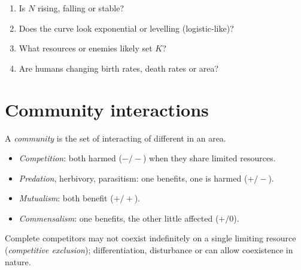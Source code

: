 \begin{method}
\label{met:g12:populations-conservation:read}
\begin{enumerate}
  \item Is $N$ rising, falling or stable?
  \item Does the curve look exponential or levelling (logistic-like)?
  \item What resources or enemies likely set $K$?
  \item Are humans changing birth rates, death rates or  area?
\end{enumerate}
\end{method}

\section{Community interactions}

\begin{definition}[Community]\label{def:g12:populations-conservation:community}
A \emph{community} is the set of interacting
 of different  in an area.
\end{definition}

\begin{definition}
\label{def:g12:populations-conservation:interactions}
\begin{itemize}
  \item \emph{Competition}: both  harmed
        ($-/-$) when they share limited resources.
  \item \emph{Predation}, herbivory, parasitism:
        one benefits, one is harmed ($+/-$).
  \item \emph{Mutualism}: both benefit ($+/+$).
  \item \emph{Commensalism}: one benefits, the
        other little affected ($+/0$).
\end{itemize}
\end{definition}

\begin{proposition}
\label{prop:g12:populations-conservation:exclusion}
Complete competitors may not coexist indefinitely on a single limiting
resource (\emph{competitive exclusion});
 differentiation, disturbance or  can allow coexistence in
nature.
\end{proposition}
\admitted

